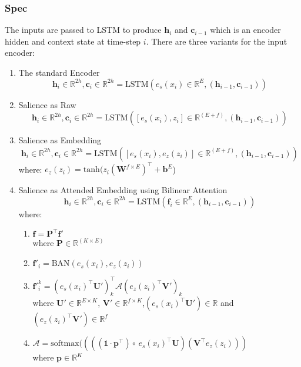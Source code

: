 \documentclass{article}
\begin{document}
  \subsubsection{Spec}
  The inputs are passed to LSTM to produce $\mathbf{h}_i$ and $\mathbf{c}_{i-1}$ which is an encoder hidden and context state at time-step $i$.
  There are three variants for the input encoder:
  \begin{enumerate}
    \item The standard Encoder
    \[
      \mathbf{h}_i \in \mathbb{R}^{2h}, \mathbf{c}_i \in \mathbb{R}^{2h} = \text{LSTM}(e_s(x_i) \in \mathbb{R}^E, (\mathbf{h}_{i-1}, \mathbf{c}_{i-1}))
    \]
    \item Salience as Raw
    \[
      \mathbf{h}_i \in \mathbb{R}^{2h}, \mathbf{c}_i \in \mathbb{R}^{2h} = \text{LSTM}([e_s(x_i), z_i] \in \mathbb{R}^{(E+f)}, (\mathbf{h}_{i-1}, \mathbf{c}_{i-1}))
    \]
    \item Salience as Embedding
    \[
      \mathbf{h}_i \in \mathbb{R}^{2h}, \mathbf{c}_i \in \mathbb{R}^{2h} = \text{LSTM}([e_s(x_i), e_z(z_i)] \in \mathbb{R}^{(E+f)}, (\mathbf{h}_{i-1}, \mathbf{c}_{i-1}))
    \]
    where:
    $e_z(z_i) = \text{tanh} (z_i (\mathbf{W}^{f\times E})^\intercal + \mathbf{b}^E$)
    \item Salience as Attended Embedding using Bilinear Attention 
    \[
      \mathbf{h}_i \in \mathbb{R}^{2h}, \mathbf{c}_i \in \mathbb{R}^{2h} = \text{LSTM}(\mathbf{f}_i \in \mathbb{R}^E, (\mathbf{h}_{i-1}, \mathbf{c}_{i-1}))
    \]
    where:
    \begin{enumerate}
      \item $\mathbf{f} = \mathbf{P}^\intercal \mathbf{f'}$ \\
      where $\mathbf{P} \in \mathbb{R}^{(K\times E)}$
      \item $\mathbf{f'}_i = \text{BAN}(e_s(x_i), e_z(z_i))$
      \item $\mathbf{f'}_i^k = (e_s(x_i)^\intercal \mathbf{U}')^\intercal_k\mathcal{A}(e_z(z_i)^\intercal\mathbf{V}')_k$\\
      where $\mathbf{U}'\in \mathbb{R}^{E\times K}$, $\mathbf{V}' \in \mathbb{R}^{f\times K}$,$(e_s(x_i)^\intercal \mathbf{U}') \in \mathbb{R}$ and $(e_z(z_i)^\intercal\mathbf{V}')\in\mathbb{R}^f$
      \item $\mathcal{A} = \text{softmax} ((((\mathds{1}\cdot \mathbf{p}^\intercal)\circ\, e_s(x_i)^\intercal \mathbf{U})(\mathbf{V}^\intercal e_z(z_i)))$ \\
      where $\mathbf{p}\in\mathbb{R}^K$
    \end{enumerate}

  \end{enumerate}
  
\end{document}
